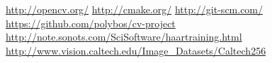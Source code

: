 \documentclass[conference]{IEEEtran}
\begin{document}
%
%
%
\renewcommand*{\refname}{Quellen}
\begin{thebibliography}{1}
		\url{http://opencv.org/}
		\url{http://cmake.org/}
		\url{http://git-scm.com/}
		\url{https://github.com/polybos/cv-project}
		\url{http://note.sonots.com/SciSoftware/haartraining.html}
		\url{http://www.vision.caltech.edu/Image_Datasets/Caltech256}
\end{thebibliography}




\end{document}

